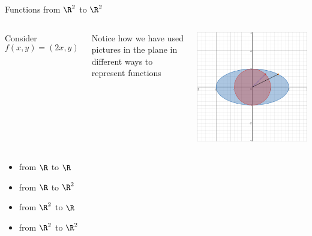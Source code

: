 \documentclass{beamer}
\begin{document}
\begin{frame}{Functions from $\R^2$ to $\R^2$}

\begin{columns}
\column[T]{5cm}
Consider
$$f(x,y) = (2x, y)$$

Notice how we have used pictures in the plane in different ways to
represent functions

\column[T]{5cm}
\includegraphics[scale=0.25]{circle-to-elipse}
\end{columns}
\begin{itemize}
\item from $\R$ to $\R$
\item from $\R$ to $\R^2$
\item from $\R^2$ to $\R$
\item from $\R^2$ to $\R^2$
\end{itemize}

\end{frame}
\end{document}
